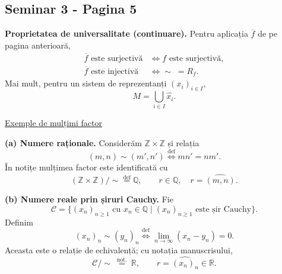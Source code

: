 
\subsection*{Seminar 3 - Pagina 5}
\begingroup
\setlength{\abovedisplayskip}{5pt}
\setlength{\belowdisplayskip}{5pt}
\setlength{\abovedisplayshortskip}{3pt}
\setlength{\belowdisplayshortskip}{3pt}

\noindent\textbf{Proprietatea de universalitate (continuare).}
Pentru aplicația $\overline f$ de pe pagina anterioară,
\[
\begin{aligned}
 \overline f\text{ este surjectivă}
   &\iff f\text{ este surjectivă},\\
 \overline f\text{ este injectivă}
   &\iff {\sim}\;=R_f.
\end{aligned}
\]
Mai mult, pentru un sistem de reprezentanți $(x_i)_{i\in I}$,
\[
 M=\bigcup_{i\in I}\widehat{x_i}.
\]

\medskip
\noindent\underline{Exemple de mulțimi factor}

\noindent\textbf{(a) Numere raționale.}
Considerăm $\mathbb Z\times\mathbb Z$ și relația
\[
 (m,n)\sim(m',n')
 \overset{\mathrm{def}}{\iff}mn'=nm'.
\]
În notițe mulțimea factor este identificată cu
\[
 (\mathbb Z\times\mathbb Z)/{\sim}
   \overset{\mathrm{def}}{=}\mathbb Q,
 \qquad
 r\in\mathbb Q,\quad r=\widehat{(m,n)}.
\]

\noindent\textbf{(b) Numere reale prin șiruri Cauchy.}
Fie
\[
 \mathcal C=\bigl\{(x_n)_{n\geq1}\text{ cu }x_n\in\mathbb Q
       \mid (x_n)_{n\geq1}\text{ este șir Cauchy}\bigr\}.
\]
Definim
\[
 (x_n)_n\sim(y_n)_n
 \overset{\mathrm{def}}{\iff}
 \lim_{n\to\infty}(x_n-y_n)=0.
\]
Aceasta este o relație de echivalență; cu notația manuscrisului,
\[
 \mathcal C/{\sim}\ \overset{\mathrm{not.}}{=}\ \mathbb R,
 \qquad
 r=\widehat{(x_n)_n}\in\mathbb R.
\]

